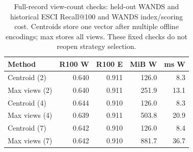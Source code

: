 \begin{table}[t]
\caption{Full-record view-count checks: held-out WANDS and historical ESCI Recall@100 and WANDS index/scoring cost. Centroids store one vector after multiple offline encodings; max stores all views. These fixed checks do not reopen strategy selection.}
\label{tab:multiview_cost}
\centering\small
\begin{tabular}{lrrrr}\toprule
Method & R100 W & R100 E & MiB W & ms W\\\midrule
Centroid (2) & 0.640 & 0.911 & 126.0 & 8.3\\
Max views (2) & 0.640 & 0.911 & 251.9 & 13.1\\
Centroid (4) & 0.644 & 0.910 & 126.0 & 8.3\\
Max views (4) & 0.639 & 0.911 & 503.8 & 20.9\\
Centroid (7) & 0.642 & 0.910 & 126.0 & 8.4\\
Max views (7) & 0.642 & 0.910 & 881.7 & 36.7\\
\bottomrule\end{tabular}
\end{table}
